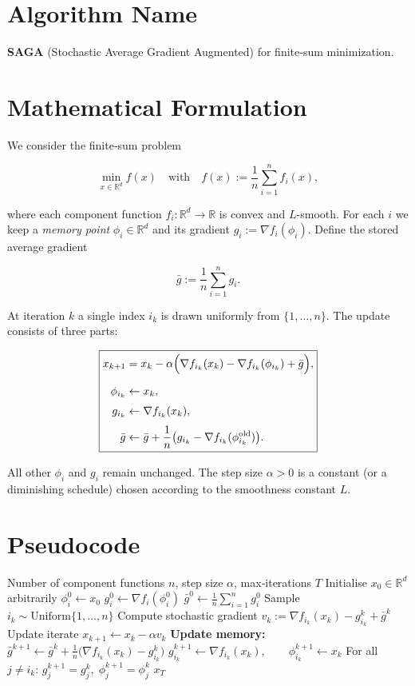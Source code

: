 \documentclass{article}
\newcommand{\R}{\mathbb{R}}
\begin{document}
\section*{Algorithm Name}
\textbf{SAGA} (Stochastic Average Gradient Augmented) for finite‑sum minimization.

\section*{Mathematical Formulation}
We consider the finite‑sum problem  

\[
\min_{x\in \R^{d}} f(x)\quad\text{with}\quad 
f(x):=\frac{1}{n}\sum_{i=1}^{n}f_i(x),
\]

where each component function \(f_i:\R^{d}\to\R\) is convex and \(L\)-smooth.
For each \(i\) we keep a \emph{memory point} \(\phi_i\in\R^{d}\) and its gradient
\(g_i:=\nabla f_i(\phi_i)\).  
Define the stored average gradient  

\[
\bar g :=\frac{1}{n}\sum_{i=1}^{n} g_i .
\]

At iteration \(k\) a single index \(i_k\) is drawn uniformly from \(\{1,\dots ,n\}\).
The update consists of three parts:

\[
\boxed{
\begin{aligned}
x_{k+1}&=x_k-\alpha\Bigl(\nabla f_{i_k}(x_k)-\nabla f_{i_k}(\phi_{i_k})+\bar g\Bigr),\\[2mm]
\phi_{i_k}&\gets x_k,\\[1mm]
g_{i_k}&\gets \nabla f_{i_k}(x_k),\\[1mm]
\bar g &\gets \bar g+\frac{1}{n}\bigl(g_{i_k}-\nabla f_{i_k}(\phi_{i_k}^{\text{old}})\bigr).
\end{aligned}}
\]

All other \(\phi_i\) and \(g_i\) remain unchanged.  
The step size \(\alpha>0\) is a constant (or a diminishing schedule) chosen
according to the smoothness constant \(L\).

\section*{Pseudocode}
\begin{algorithm}[H]
\caption{SAGA}
\begin{algorithmic}[1]
\Require Number of component functions \(n\), step size \(\alpha\), max‑iterations \(T\)
\State Initialise \(x_0\in\R^{d}\) arbitrarily
    \State \(\phi_i^{0}\gets x_0\)
    \State \(g_i^{0}\gets \nabla f_i(\phi_i^{0})\)
\EndFor
\State \(\bar g^{0}\gets \frac{1}{n}\sum_{i=1}^{n} g_i^{0}\)
    \State Sample \(i_k\sim\text{Uniform}\{1,\dots ,n\}\)
    \State Compute stochastic gradient \(v_k:=\nabla f_{i_k}(x_k)-g_{i_k}^{k}+\bar g^{k}\)
    \State Update iterate \(x_{k+1}\gets x_k-\alpha v_k\)
    \State \textbf{Update memory:}
    \State \( \bar g^{k+1}\gets \bar g^{k}+ \frac{1}{n}\bigl(\nabla f_{i_k}(x_k)-g_{i_k}^{k}\bigr)\)
    \State \(g_{i_k}^{k+1}\gets \nabla f_{i_k}(x_k),\qquad 
           \phi_{i_k}^{k+1}\gets x_k\)
    \State For all \(j\neq i_k\): \(g_{j}^{k+1}=g_{j}^{k},\;\phi_{j}^{k+1}=\phi_{j}^{k}\)
\EndFor
\State \Return \(x_T\)
\end{algorithmic}
\end{algorithm}
\end{document}
